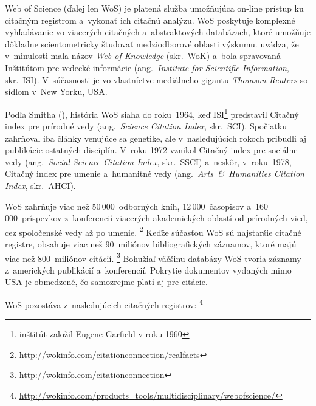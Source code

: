 Web of Science (ďalej len WoS) je platená služba umožňujúca on-line prístup ku
citačným registrom a~vykonať ich citačnú analýzu.  WoS poskytuje komplexné
vyhľadávanie vo viacerých citačných a~abstraktových databázach, ktoré umožňuje
dôkladne scientometricky študovať medziodborové oblasti výskumu.
\citet{Drake2005} uvádza, že v~minulosti mala názov \emph{Web of Knowledge}
(skr.~WoK) a~bola spravovaná Inštitútom pre vedecké informácie
(ang.~\emph{Institute for Scientific Information}, skr.~ISI).  V~súčasnosti je
vo vlastníctve mediálneho gigantu \emph{Thomson Reuters} so sídlom v~New Yorku,
USA.

Podľa Smitha (\citeyear{Smith2012}), história WoS siaha do roku~1964, keď
ISI\footnote{inštitút založil Eugene Garfield v roku 1960} predstavil Citačný
index pre prírodné vedy (ang.~\emph{Science Citation Index}, skr.~SCI).
Spočiatku zahrňoval iba články venujúce sa genetike, ale v~nasledujúcich rokoch
pribudli aj publikácie ostatných disciplín.  V~roku 1972 vznikol Citačný index
pre sociálne vedy (ang.~\emph{Social Science Citation Index}, skr.~SSCI)
a~neskôr, v~roku~1978, Citačný index pre umenie a~humanitné vedy
(ang.~\emph{Arts~\&~Humanities Citation Index}, skr.~AHCI).

WoS zahrňuje viac než 50\,000~odborných kníh, 12\,000~časopisov
a~160\,000~príspevkov z~konferencií viacerých akademických oblastí od prírodných
vied, cez spoločenské vedy až po umenie.%
\footnote{\url{http://wokinfo.com/citationconnection/realfacts}} Keďže súčasťou
WoS sú najstaršie citačné registre, obsahuje viac než 90~miliónov
bibliografických záznamov, ktoré majú viac než 800~miliónov citácií.%
\footnote{\url{http://wokinfo.com/citationconnection}} Bohužiaľ väčšinu databázy
WoS tvoria záznamy z~amerických publikácií a~konferencií.  Pokrytie dokumentov
vydaných mimo USA je obmedzené, čo samozrejme platí aj pre citácie.

WoS pozostáva z~nasledujúcich citačných registrov:%
\footnote{\url{http://wokinfo.com/products_tools/multidisciplinary/webofscience/}}

